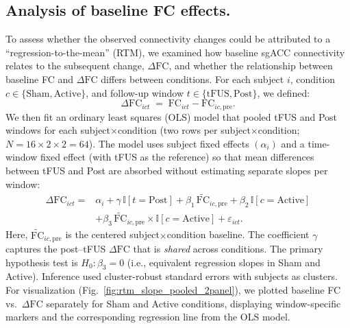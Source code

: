 \subsection*{Analysis of baseline FC effects.}
\noindent
To assess whether the observed connectivity changes could be attributed to a ``regression-to-the-mean'' (RTM), we examined how baseline sgACC connectivity relates to the subsequent change, \(\Delta \mathrm{FC}\), and whether the relationship between baseline FC and $\Delta \mathrm{FC}$ differs between conditions. For each subject \(i\), condition \(c\in\{\text{Sham},\text{Active}\}\), and follow-up window \(t\in\{\text{tFUS},\text{Post}\}\), we defined:
\begin{equation}
\label{eq:delta_fc_def}
\Delta \mathrm{FC}_{ict} \;=\; \mathrm{FC}_{ict} - \mathrm{FC}_{ic,\mathrm{pre}}.
\end{equation}
We then fit an ordinary least squares (OLS) model that pooled tFUS and Post windows for each subject\(\times\)condition (two rows per subject\(\times\)condition; \(N=16\times 2\times 2=64\)). The model uses subject fixed effects \((\alpha_i)\) and a time-window fixed effect (with tFUS as the reference) so that mean differences between tFUS and Post are absorbed without estimating separate slopes per window:
\begin{equation}
    \begin{aligned}
    \Delta \mathrm{FC}_{ict} = {}& \alpha_i
      + \gamma\,\mathbb{I}[t=\text{Post}]
      + \beta_1\,\widetilde{\mathrm{FC}}_{ic,\mathrm{pre}} + \beta_2\,\mathbb{I}[c=\text{Active}] \\
      &
      + \beta_3\,\widetilde{\mathrm{FC}}_{ic,\mathrm{pre}}\times \mathbb{I}[c=\text{Active}]
      + \varepsilon_{ict}.
    \end{aligned}
    \end{equation}
Here, \(\widetilde{\mathrm{FC}}_{ic,\mathrm{pre}}\) is the centered subject\(\times\)condition baseline. The coefficient \(\gamma\) captures the post--tFUS \(\Delta \mathrm{FC}\) that is \emph{shared} across conditions. The primary hypothesis test is \(H_0:\beta_3=0\) (i.e., equivalent regression slopes in Sham and Active). Inference used cluster-robust standard errors with subjects as clusters. For visualization (Fig.~\ref{fig:rtm_slope_pooled_2panel}), we plotted baseline FC vs.\ \(\Delta \mathrm{FC}\) separately for Sham and Active conditions, displaying window-specific markers and the corresponding regression line from the OLS model.


